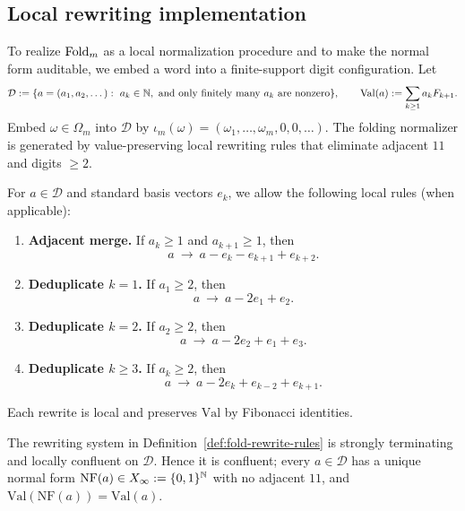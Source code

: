 \subsection{Local rewriting implementation}\label{subsec:fold-rewrite}
To realize $\mathrm{Fold}_m$ as a local normalization procedure and to make the normal form auditable, we embed a word into a finite-support digit configuration.
Let
\[
\mathcal{D}:=\{a=(a_1,a_2,\dots):\ a_k\in\NN,\ \text{and only finitely many $a_k$ are nonzero}\},
\qquad
\mathrm{Val}(a):=\sum_{k\ge 1} a_k F_{k+1}.
\]
Embed $\omega\in\Omega_m$ into $\mathcal{D}$ by $\iota_m(\omega)=(\omega_1,\dots,\omega_m,0,0,\dots)$.
The folding normalizer is generated by value-preserving local rewriting rules that eliminate adjacent $11$ and digits $\ge 2$.

\begin{definition}\label{def:fold-rewrite-rules}
For $a\in\mathcal{D}$ and standard basis vectors $e_k$, we allow the following local rules (when applicable):
\begin{enumerate}
  \renewcommand{\theenumi}{R\arabic{enumi}}
  \renewcommand{\labelenumi}{(\theenumi)}
  \item\label{rule:adj-merge}\textbf{Adjacent merge.} If $a_k\ge 1$ and $a_{k+1}\ge 1$, then
  \[
  a\ \to\ a-e_k-e_{k+1}+e_{k+2}.
  \]
  \item\label{rule:dedup-1}\textbf{Deduplicate $k=1$.} If $a_1\ge 2$, then
  \[
  a\ \to\ a-2e_1+e_2.
  \]
  \item\label{rule:dedup-2}\textbf{Deduplicate $k=2$.} If $a_2\ge 2$, then
  \[
  a\ \to\ a-2e_2+e_1+e_3.
  \]
  \item\label{rule:dedup-k}\textbf{Deduplicate $k\ge 3$.} If $a_k\ge 2$, then
  \[
  a\ \to\ a-2e_k+e_{k-2}+e_{k+1}.
  \]
\end{enumerate}
Each rewrite is local and preserves $\mathrm{Val}$ by Fibonacci identities.
\end{definition}

\begin{proposition}\label{prop:fold-termination-confluence}
The rewriting system in Definition~\ref{def:fold-rewrite-rules} is strongly terminating and locally confluent on $\mathcal{D}$.
Hence it is confluent; every $a\in\mathcal{D}$ has a unique normal form $\mathrm{NF}(a)\in X_\infty:=\{0,1\}^{\mathbb{N}}$ with no adjacent $11$, and $\mathrm{Val}(\mathrm{NF}(a))=\mathrm{Val}(a)$.
\end{proposition}

